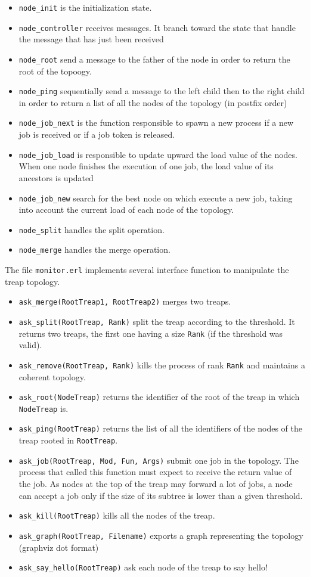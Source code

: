 \documentclass[a4paper, 11pt]{article}
\begin{document}
\begin{itemize}
	\item \verb|node_init| is the initialization state. 
	\item \verb|node_controller| receives messages. It branch toward the state that handle the message that has just been received
	\item \verb|node_root| send a message to the father of the node in order to return the root of the topoogy.
	\item \verb|node_ping| sequentially send a message to the left child then to the right child in order to return a list of all the nodes of the topology (in postfix order)
	\item \verb|node_job_next| is the function responsible to spawn a new process if a new job is received or if a job token is released.
	\item \verb|node_job_load| is responsible to update upward the load value of the nodes. When one node finishes the execution of one job, the load value of its ancestors is updated
	\item \verb|node_job_new| search for the best node on which execute a new job, taking into account the current load of each node of the topology.
	\item \verb|node_split| handles the split operation.
	\item \verb|node_merge| handles the merge operation.
\end{itemize}

\noindent The file \verb|monitor.erl| implements several interface function to manipulate the treap topology.
\begin{itemize}
	\item \verb|ask_merge(RootTreap1, RootTreap2)| merges two treaps.
	\item \verb|ask_split(RootTreap, Rank)| split the treap according to the threshold. It returns two treaps, the first one having a size \verb|Rank| (if the threshold was valid).
	\item \verb|ask_remove(RootTreap, Rank)| kills the process of rank \verb|Rank| and maintains a coherent topology.
	\item \verb|ask_root(NodeTreap)| returns the identifier of the root of the treap in which \verb|NodeTreap| is.
	\item \verb|ask_ping(RootTreap)| returns the list of all the identifiers of the nodes of the treap rooted in \verb|RootTreap|.
	\item \verb|ask_job(RootTreap, Mod, Fun, Args)| submit one job in the topology. The process that called this function must expect to receive the return value of the job. As nodes at the top of the treap may forward a lot of jobs, a node can accept a job only if the size of its subtree is lower than a given threshold.
	\item \verb|ask_kill(RootTreap)| kills all the nodes of the treap.
	\item \verb|ask_graph(RootTreap, Filename)| exports a graph representing the topology (graphviz dot format)
	\item \verb|ask_say_hello(RootTreap)| ask each node of the treap to say hello!
\end{itemize}
\end{document}
